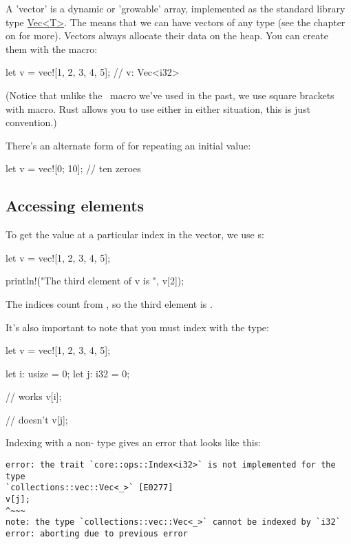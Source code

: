 A 'vector' is a dynamic or 'growable' array, implemented as the standard library type \href{https://doc.rust-lang.org/std/vec/}{Vec<T>}. The 
 means that we can have vectors of any type (see the chapter on  for more). Vectors always allocate 
their data on the heap. You can create them with the  macro:

\begin{rustc}
let v = vec![1, 2, 3, 4, 5]; // v: Vec<i32>
\end{rustc}

(Notice that unlike the \println\ macro we've used in the past, we use square brackets \code{[]} with  macro. Rust allows you to 
use either in either situation, this is just convention.)

\blank

There's an alternate form of  for repeating an initial value:

\begin{rustc}
let v = vec![0; 10]; // ten zeroes
\end{rustc}

\subsection*{Accessing elements}

To get the value at a particular index in the vector, we use \code{[]}s:

\begin{rustc}
let v = vec![1, 2, 3, 4, 5];

println!("The third element of v is {}", v[2]);
\end{rustc}

The indices count from , so the third element is .

\blank

It's also important to note that you must index with the  type:

\begin{rustc}
let v = vec![1, 2, 3, 4, 5];

let i: usize = 0;
let j: i32 = 0;

// works
v[i];

// doesn't
v[j];
\end{rustc}

Indexing with a non- type gives an error that looks like this:

\begin{verbatim}
error: the trait `core::ops::Index<i32>` is not implemented for the type
`collections::vec::Vec<_>` [E0277]
v[j];
^~~~
note: the type `collections::vec::Vec<_>` cannot be indexed by `i32`
error: aborting due to previous error
\end{verbatim}


